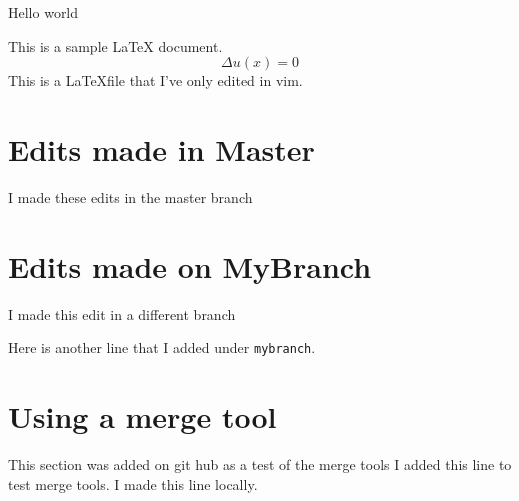 \documentclass[11pt,letterpaper]{article}
\begin{document}
	
	Hello world
	
	This is a sample LaTeX document.
	\begin{equation} \Delta u(x)=0\end{equation}
	This is a \LaTeX file that I've only edited in vim.	
	
	\section{Edits made in Master}
	I made these edits in the master branch

	\section{Edits made on MyBranch}
	I made this edit in a different branch

	Here is another line that I added under \verb|mybranch|. 
	
	\section{Using a merge tool}
	This section was added on git hub as a test of the merge tools
	I added this line to test merge tools. I made this line locally. 
\end{document}
